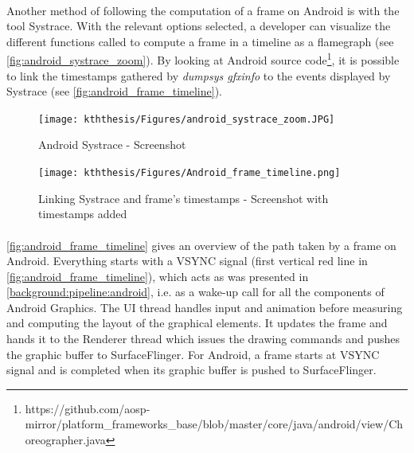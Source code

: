 \documentclass{kththesis}
\begin{document}
    \paragraph{}
    Another method of following the computation of a frame on Android is with the tool Systrace. With the relevant options selected, a developer can visualize the different functions called to compute a frame in a timeline as a flamegraph (see \autoref{fig:android_systrace_zoom}). \newline
    By looking at Android source code\footnote{https://github.com/aosp-mirror/platform_frameworks_base/blob/master/core/java/android/view/Choreographer.java}, it is possible to link the timestamps gathered by \textit{dumpsys gfxinfo} to the events displayed by Systrace (see \autoref{fig:android_frame_timeline}). 
    
    \begin{figure}
        \centering
        \texttt{[image: kththesis/Figures/android\_systrace\_zoom.JPG]}
        \caption{Android Systrace - Screenshot}
        \label{fig:android_systrace_zoom}
    \end{figure}
    
    \begin{figure}[!ht]
        \centering
        \texttt{[image: kththesis/Figures/Android\_frame\_timeline.png]}
        \caption{Linking Systrace and frame's timestamps - Screenshot with timestamps added}
        \label{fig:android_frame_timeline}
    \end{figure}
    
    \paragraph{}
    \autoref{fig:android_frame_timeline} gives an overview of the path taken by a frame on Android. Everything starts with a VSYNC signal (first vertical red line in \autoref{fig:android_frame_timeline}), which acts as was presented in \autoref{background:pipeline:android}, i.e. as a wake-up call for all the components of Android Graphics. The UI thread handles input and animation before measuring and computing the layout of the graphical elements. It updates the frame and hands it to the Renderer thread which issues the drawing commands and pushes the graphic buffer to SurfaceFlinger. For Android, a frame starts at VSYNC signal and is completed when its graphic buffer is pushed to SurfaceFlinger.
    
\end{document}
